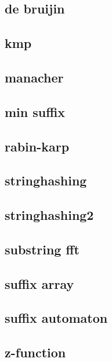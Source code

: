 \subsection{de bruijin}
\raggedbottom
\hrulefill
\subsection{kmp}
\raggedbottom
\hrulefill
\subsection{manacher}
\raggedbottom
\hrulefill
\subsection{min suffix}
\raggedbottom
\hrulefill
\subsection{rabin-karp}
\raggedbottom
\hrulefill
\subsection{stringhashing}
\raggedbottom
\hrulefill
\subsection{stringhashing2}
\raggedbottom
\hrulefill
\subsection{substring fft}
\raggedbottom
\hrulefill
\subsection{suffix array}
\raggedbottom
\hrulefill
\subsection{suffix automaton}
\raggedbottom
\hrulefill
\subsection{z-function}
\raggedbottom
\hrulefill

